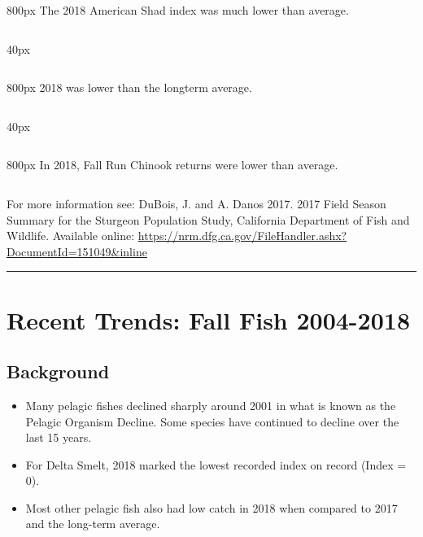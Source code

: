 \documentclass[
]{book}
\providecommand{\tightlist}{%
  \setlength{\itemsep}{0pt}\setlength{\parskip}{0pt}}
\begin{document}
\begin{column}{800px\textwidth}
The 2018 American Shad index was much lower than average.
\end{column}

\begin{column}{40px\textwidth}
~
\end{column}

\begin{column}{800px\textwidth}
2018 was lower than the longterm average.
\end{column}

\begin{column}{40px\textwidth}
~
\end{column}

\begin{column}{800px\textwidth}
In 2018, Fall Run Chinook returns were lower than average.
\end{column}

\begin{disclaimer}
For more information see: DuBois, J. and A. Danos 2017. 2017 Field
Season Summary for the Sturgeon Population Study, California Department
of Fish and Wildlife. Available online:
\url{https://nrm.dfg.ca.gov/FileHandler.ashx?DocumentId=151049\&inline}
\end{disclaimer}

\begin{center}\rule{0.5\linewidth}{0.5pt}\end{center}

\hypertarget{recent-trends-fall-fish-2004-2018}{%
\section{Recent Trends: Fall Fish 2004-2018}\label{recent-trends-fall-fish-2004-2018}}

\hypertarget{background-17}{%
\subsection{Background}\label{background-17}}

\begin{itemize}
\tightlist
\item
  Many pelagic fishes declined sharply around 2001 in what is known as the Pelagic Organism Decline. Some species have continued to decline over the last 15 years.
\item
  For Delta Smelt, 2018 marked the lowest recorded index on record (Index = 0).
\item
  Most other pelagic fish also had low catch in 2018 when compared to 2017 and the long-term average.
\end{itemize}
\end{document}
